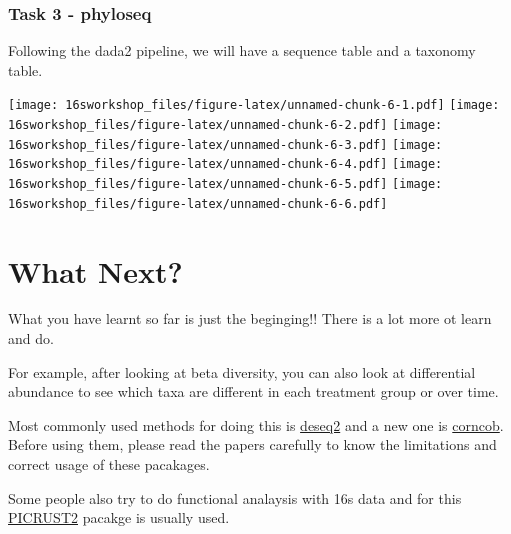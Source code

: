 \documentclass[
]{book}
\begin{document}
\hypertarget{task-3---phyloseq}{%
\subsection{Task 3 - phyloseq}\label{task-3---phyloseq}}

Following the dada2 pipeline, we will have a sequence table and a taxonomy table.

\texttt{[image: 16sworkshop\_files/figure-latex/unnamed-chunk-6-1.pdf]} \texttt{[image: 16sworkshop\_files/figure-latex/unnamed-chunk-6-2.pdf]} \texttt{[image: 16sworkshop\_files/figure-latex/unnamed-chunk-6-3.pdf]} \texttt{[image: 16sworkshop\_files/figure-latex/unnamed-chunk-6-4.pdf]} \texttt{[image: 16sworkshop\_files/figure-latex/unnamed-chunk-6-5.pdf]} \texttt{[image: 16sworkshop\_files/figure-latex/unnamed-chunk-6-6.pdf]}

\hypertarget{what-next}{%
\chapter{What Next?}\label{what-next}}

What you have learnt so far is just the beginging!! There is a lot more ot learn and do.

For example, after looking at beta diversity, you can also look at differential abundance to see which taxa are different in each treatment group or over time.

Most commonly used methods for doing this is \href{https://bioconductor.org/packages/release/bioc/html/DESeq2.html}{deseq2} and a new one is \href{https://github.com/bryandmartin/corncob/}{corncob}. Before using them, please read the papers carefully to know the limitations and correct usage of these pacakages.

Some people also try to do functional analaysis with 16s data and for this \href{https://github.com/picrust/picrust2/wiki}{PICRUST2} pacakge is usually used.

  
\end{document}
